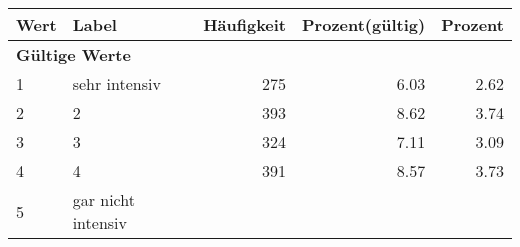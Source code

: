      \begin{longtable}{lXrrr}
     \toprule
     \textbf{Wert} & \textbf{Label} & \textbf{Häufigkeit} & \textbf{Prozent(gültig)} & \textbf{Prozent} \\
     \endhead
     \midrule
     \multicolumn{5}{l}{\textbf{Gültige Werte}}\\

     1 &
     \multicolumn{1}{X}{ sehr intensiv   } &


       \num{275} &
       \num[round-mode=places,round-precision=2]{6.03} &
         \num[round-mode=places,round-precision=2]{2.62} \\

     2 &
     \multicolumn{1}{X}{ 2   } &


       \num{393} &
       \num[round-mode=places,round-precision=2]{8.62} &
         \num[round-mode=places,round-precision=2]{3.74} \\

     3 &
     \multicolumn{1}{X}{ 3   } &


       \num{324} &
       \num[round-mode=places,round-precision=2]{7.11} &
         \num[round-mode=places,round-precision=2]{3.09} \\

     4 &
     \multicolumn{1}{X}{ 4   } &


       \num{391} &
       \num[round-mode=places,round-precision=2]{8.57} &
         \num[round-mode=places,round-precision=2]{3.73} \\

     5 &
     \multicolumn{1}{X}{ gar nicht intensiv   } &



\end{longtable}
